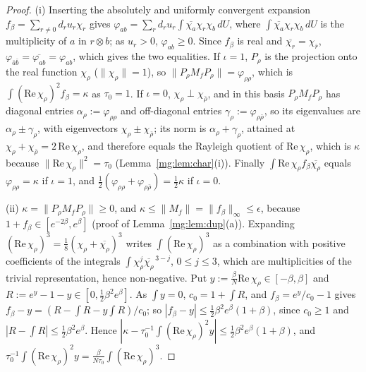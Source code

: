 \documentclass[11pt,a4paper]{article}
\theoremstyle{definition}
\theoremstyle{remark}
\newcommand{\dU}{\,dU}
\newcommand{\norm}[1]{\lVert #1\rVert}
\begin{document}
\begin{proof}
(i) Inserting the absolutely and uniformly convergent expansion $f_\beta=\sum_{r\ne0}d_ru_r\chi_r$ gives
$\varphi_{ab}=\sum_rd_ru_r\int\overline{\chi_a}\chi_r\chi_b\dU$, where $\int\overline{\chi_a}\chi_r\chi_b\dU$ is the multiplicity of $a$ in $r\otimes b$; as $u_r>0$, $\varphi_{ab}\ge0$. Since $f_\beta$ is real and
$\overline{\chi_r}=\chi_{\bar r}$, $\varphi_{\bar a\bar b}=\overline{\varphi_{ab}}=\varphi_{ab}$, which gives the two equalities. If $\iota=1$, $P_\rho$
is the projection onto the real function $\chi_\rho$ ($\norm{\chi_\rho}=1$), so $\norm{P_\rho M_fP_\rho}=\varphi_{\rho\rho}$, which is
$\int(\mathrm{Re}\,\chi_\rho)^2f_\beta=\kappa$ as $\tau_0=1$. If $\iota=0$, $\chi_\rho\perp\chi_{\bar\rho}$, and in this basis $P_\rho M_fP_\rho$ has diagonal entries $\alpha_\rho:=\varphi_{\rho\rho}$ and
off-diagonal entries $\gamma_\rho:=\varphi_{\rho\bar\rho}$, so its eigenvalues are $\alpha_\rho\pm\gamma_\rho$, with eigenvectors $\chi_\rho\pm\chi_{\bar\rho}$; its norm is
$\alpha_\rho+\gamma_\rho$, attained at $\chi_\rho+\chi_{\bar\rho}=2\,\mathrm{Re}\,\chi_\rho$, and therefore equals the Rayleigh quotient of $\mathrm{Re}\,\chi_\rho$, which is
$\kappa$ because $\norm{\mathrm{Re}\,\chi_\rho}^2=\tau_0$ (Lemma~\ref{mg:lem:char}(i)). Finally
$\int\mathrm{Re}\,\chi_\rho f_\beta\overline{\chi_\rho}$ equals $\varphi_{\rho\rho}=\kappa$ if $\iota=1$, and $\frac12(\varphi_{\rho\rho}+\varphi_{\rho\bar\rho})=\frac12\kappa$ if
$\iota=0$.

(ii) $\kappa=\norm{P_\rho M_fP_\rho}\ge0$, and $\kappa\le\norm{M_f}=\norm{f_\beta}_\infty\le\epsilon$, because $1+f_\beta\in[e^{-2\beta},e^\beta]$ (proof of
Lemma~\ref{mg:lem:dup}(a)). Expanding $(\mathrm{Re}\,\chi_\rho)^3=\frac18(\chi_\rho+\overline{\chi_\rho})^3$ writes $\int(\mathrm{Re}\,\chi_\rho)^3$ as a combination
with positive coefficients of the integrals $\int\chi_\rho^j\overline{\chi_\rho}^{\,3-j}$, $0\le j\le3$, which are multiplicities of the trivial
representation, hence non-negative. Put $y:=\frac\beta N\mathrm{Re}\,\chi_\rho\in[-\beta,\beta]$ and $R:=e^y-1-y\in[0,\frac12\beta^2e^\beta]$. As
$\int y=0$, $c_0=1+\int R$, and $f_\beta=e^y/c_0-1$ gives $f_\beta-y=(R-\int R-y\int R)/c_0$; so $|f_\beta-y|\le\frac12\beta^2e^\beta(1+\beta)$, since
$c_0\ge1$ and $|R-\int R|\le\frac12\beta^2e^\beta$. Hence $|\kappa-\tau_0^{-1}\int(\mathrm{Re}\,\chi_\rho)^2y|\le\frac12\beta^2e^\beta(1+\beta)$, and
$\tau_0^{-1}\int(\mathrm{Re}\,\chi_\rho)^2y=\frac\beta{N\tau_0}\int(\mathrm{Re}\,\chi_\rho)^3$.


\end{proof}
\end{document}
